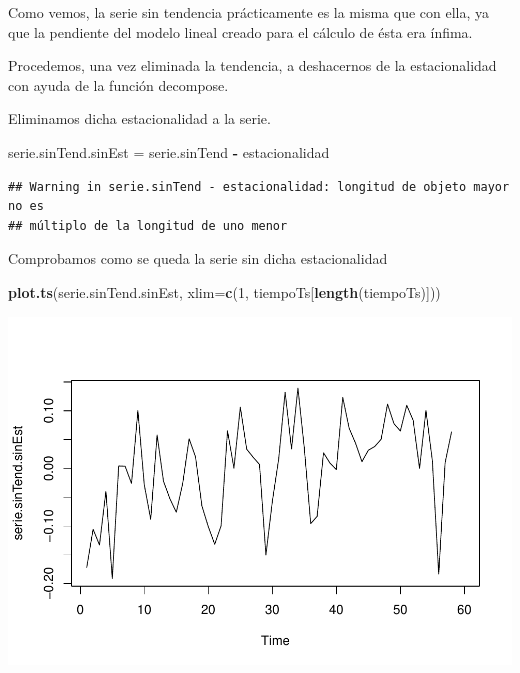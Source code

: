 \documentclass[]{article}
\newenvironment{Shaded}{\begin{snugshade}}{\end{snugshade}}
\newcommand{\KeywordTok}[1]{\textcolor[rgb]{0.13,0.29,0.53}{\textbf{#1}}}
\newcommand{\DataTypeTok}[1]{\textcolor[rgb]{0.13,0.29,0.53}{#1}}
\newcommand{\DecValTok}[1]{\textcolor[rgb]{0.00,0.00,0.81}{#1}}
\newcommand{\StringTok}[1]{\textcolor[rgb]{0.31,0.60,0.02}{#1}}
\newcommand{\CommentTok}[1]{\textcolor[rgb]{0.56,0.35,0.01}{\textit{#1}}}
\newcommand{\OperatorTok}[1]{\textcolor[rgb]{0.81,0.36,0.00}{\textbf{#1}}}
\newcommand{\NormalTok}[1]{#1}
\begin{document}
Como vemos, la serie sin tendencia prácticamente es la misma que con
ella, ya que la pendiente del modelo lineal creado para el cálculo de
ésta era ínfima.

Procedemos, una vez eliminada la tendencia, a deshacernos de la
estacionalidad con ayuda de la función decompose.

\begin{Shaded}
\end{Shaded}

Eliminamos dicha estacionalidad a la serie.

\begin{Shaded}
\begin{Highlighting}[]
\NormalTok{serie.sinTend.sinEst =}\StringTok{ }\NormalTok{serie.sinTend }\OperatorTok{-}\StringTok{ }\NormalTok{estacionalidad}
\end{Highlighting}
\end{Shaded}

\begin{verbatim}
## Warning in serie.sinTend - estacionalidad: longitud de objeto mayor no es
## múltiplo de la longitud de uno menor
\end{verbatim}

Comprobamos como se queda la serie sin dicha estacionalidad

\begin{Shaded}
\begin{Highlighting}[]
\KeywordTok{plot.ts}\NormalTok{(serie.sinTend.sinEst, }\DataTypeTok{xlim=}\KeywordTok{c}\NormalTok{(}\DecValTok{1}\NormalTok{, tiempoTs[}\KeywordTok{length}\NormalTok{(tiempoTs)])) }
\end{Highlighting}
\end{Shaded}

\includegraphics{timeSeries_files/figure-latex/unnamed-chunk-20-1.pdf}
\end{document}
